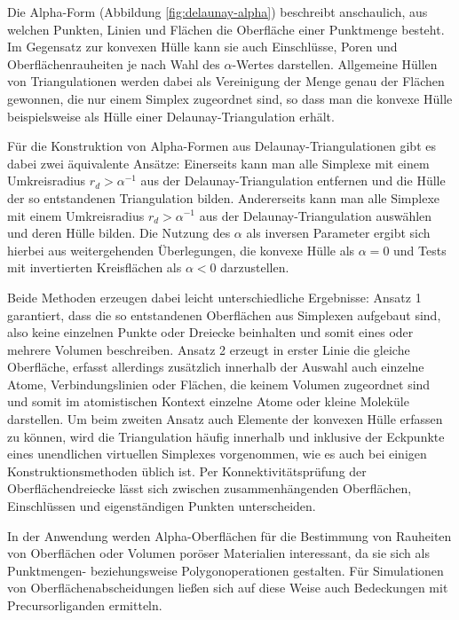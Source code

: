 Die Alpha-Form (Abbildung \ref{fig:delaunay-alpha}) beschreibt anschaulich, aus welchen Punkten, Linien und Flächen die Oberfläche einer Punktmenge besteht.
Im Gegensatz zur konvexen Hülle kann sie auch Einschlüsse, Poren und Oberflächenrauheiten je nach Wahl des $\alpha$-Wertes darstellen.
Allgemeine Hüllen von Triangulationen werden dabei als Vereinigung der Menge genau der Flächen gewonnen, die nur einem Simplex zugeordnet sind, so dass man die konvexe Hülle beispielsweise als Hülle einer Delaunay-Triangulation erhält.

Für die Konstruktion von Alpha-Formen aus Delaunay-Triangulationen gibt es dabei zwei äquivalente Ansätze:
Einerseits kann man alle Simplexe mit einem Umkreisradius $r_d > \alpha^{-1}$ aus der Delaunay-Triangulation entfernen und die Hülle der so entstandenen Triangulation bilden.
Andererseits kann man alle Simplexe mit einem Umkreisradius $r_d > \alpha^{-1}$ aus der Delaunay-Triangulation auswählen und deren Hülle bilden.
Die Nutzung des $\alpha$ als inversen Parameter ergibt sich hierbei aus weitergehenden Überlegungen, die konvexe Hülle als $\alpha=0$ und Tests mit invertierten Kreisflächen als $\alpha<0$ darzustellen.

Beide Methoden erzeugen dabei leicht unterschiedliche Ergebnisse:
Ansatz 1 garantiert, dass die so entstandenen Oberflächen aus Simplexen aufgebaut sind, also keine einzelnen Punkte oder Dreiecke beinhalten und somit eines oder mehrere Volumen beschreiben.
Ansatz 2 erzeugt in erster Linie die gleiche Oberfläche, erfasst allerdings zusätzlich innerhalb der Auswahl auch einzelne Atome, Verbindungslinien oder Flächen, die keinem Volumen zugeordnet sind und somit im atomistischen Kontext einzelne Atome oder kleine Moleküle darstellen.
Um beim zweiten Ansatz auch Elemente der konvexen Hülle erfassen zu können, wird die Triangulation häufig innerhalb und inklusive der Eckpunkte eines unendlichen virtuellen Simplexes vorgenommen, wie es auch bei einigen Konstruktionsmethoden üblich ist.
Per Konnektivitätsprüfung der Oberflächendreiecke lässt sich zwischen zusammenhängenden Oberflächen, Einschlüssen und eigenständigen Punkten unterscheiden.

In der Anwendung werden Alpha-Oberflächen für die Bestimmung von Rauheiten von Oberflächen oder Volumen poröser Materialien interessant, da sie sich als Punktmengen- beziehungsweise Polygonoperationen gestalten.
Für Simulationen von Oberflächenabscheidungen ließen sich auf diese Weise auch Bedeckungen mit Precursorliganden ermitteln.

